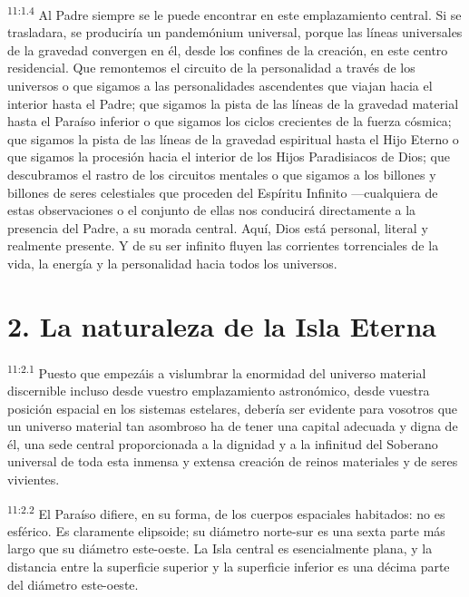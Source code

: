 \par
\textsuperscript{11:1.4} Al Padre siempre se le puede encontrar en este emplazamiento central. Si se trasladara, se produciría un pandemónium universal, porque las líneas universales de la gravedad convergen en él, desde los confines de la creación, en este centro residencial. Que remontemos el circuito de la personalidad a través de los universos o que sigamos a las personalidades ascendentes que viajan hacia el interior hasta el Padre; que sigamos la pista de las líneas de la gravedad material hasta el Paraíso inferior o que sigamos los ciclos crecientes de la fuerza cósmica; que sigamos la pista de las líneas de la gravedad espiritual hasta el Hijo Eterno o que sigamos la procesión hacia el interior de los Hijos Paradisiacos de Dios; que descubramos el rastro de los circuitos mentales o que sigamos a los billones y billones de seres celestiales que proceden del Espíritu Infinito ---cualquiera de estas observaciones o el conjunto de ellas nos conducirá directamente a la presencia del Padre, a su morada central. Aquí, Dios está personal, literal y realmente presente. Y de su ser infinito fluyen las corrientes torrenciales de la vida, la energía y la personalidad hacia todos los universos.

\section*{2. La naturaleza de la Isla Eterna}
\par
\textsuperscript{11:2.1} Puesto que empezáis a vislumbrar la enormidad del universo material discernible incluso desde vuestro emplazamiento astronómico, desde vuestra posición espacial en los sistemas estelares, debería ser evidente para vosotros que un universo material tan asombroso ha de tener una capital adecuada y digna de él, una sede central proporcionada a la dignidad y a la infinitud del Soberano universal de toda esta inmensa y extensa creación de reinos materiales y de seres vivientes.

\par
\textsuperscript{11:2.2} El Paraíso difiere, en su forma, de los cuerpos espaciales habitados: no es esférico. Es claramente elipsoide; su diámetro norte-sur es una sexta parte más largo que su diámetro este-oeste. La Isla central es esencialmente plana, y la distancia entre la superficie superior y la superficie inferior es una décima parte del diámetro este-oeste.

